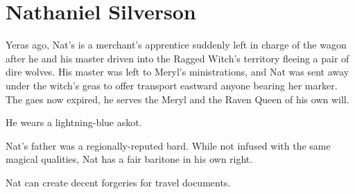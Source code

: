 \section{Nathaniel Silverson}

Yeras ago, Nat's is a merchant's apprentice suddenly left in charge of the wagon after he
  and his master driven into the Ragged Witch's territory fleeing a pair of dire wolves.
His master was left to Meryl's ministrations, and Nat was sent away under the witch's geas to
  offer transport eastward anyone bearing her marker.
The gaes now expired, he serves the Meryl and the Raven Queen of his own will.

He wears a lightning-blue askot.

Nat's father was a regionally-reputed bard.
While not infused with the same magical qualities, Nat has a fair baritone in his own right.

Nat can create decent forgeries for travel documents.
